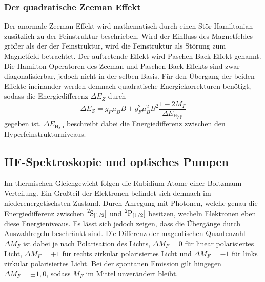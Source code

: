\subsubsection{Der quadratische Zeeman Effekt}
Der anormale Zeeman Effekt wird mathematisch durch einen Stör-Hamiltonian
zusätzlich zu der Feinstruktur beschrieben. Wird der Einfluss des 
Magnetfeldes größer als der der Feinstruktur, wird die Feinstruktur
als Störung zum Magnetfeld betrachtet. Der auftretende Effekt wird 
Paschen-Back Effekt genannt. Die Hamilton-Operatoren des Zeeman und 
Paschen-Back Effekts sind zwar diagonalisierbar, jedoch nicht in der 
selben Basis. Für den Übergang der beiden Effekte ineinander werden 
demnach quadratische Energiekorrekturen benötigt, sodass die 
Energiedifferenz $\Delta E_Z$ durch 
\begin{equation}
    \Delta E_Z=g_F\mu_BB+g_F^2\mu_B^2B^2\frac{1-2M_F}{\Delta E_\text{Hyp}}
\end{equation}
gegeben ist. $\Delta E_\text{Hyp}$ beschreibt dabei die Energiedifferenz
zwischen den Hyperfeinstrukturniveaus.

\subsection{HF-Spektroskopie und optisches Pumpen}
Im thermischen Gleichgewicht folgen die Rubidium-Atome einer 
Boltzmann-Verteilung. Ein Großteil der Elektronen befindet sich 
demnach im niederenergetischsten Zustand. Durch Anregung mit Photonen,
welche genau die Energiedifferenz zwischen $\ce{^{2}S_[1/2]}$ und 
$\ce{^{2}P_[1/2]}$ besitzen, wecheln Elektronen eben diese Energieniveaus.
Es lässt sich jedoch zeigen, dass die Übergänge durch Auswahlregeln 
beschränkt sind. Die Differenz der magentischen Quantenzahl $\Delta M_F$
ist dabei je nach Polarisation des Lichts, $\Delta M_F=0$ für 
linear polarisiertes Licht, $\Delta M_F=+1$ für rechts zirkular
polarisiertes Licht und $\Delta M_F=-1$ für links zirkular polarisiertes
Licht. Bei der spontanen Emission gilt hingegen $\Delta M_F =\pm 1,0$, 
sodass $M_F$ im Mittel unverändert bleibt. 

